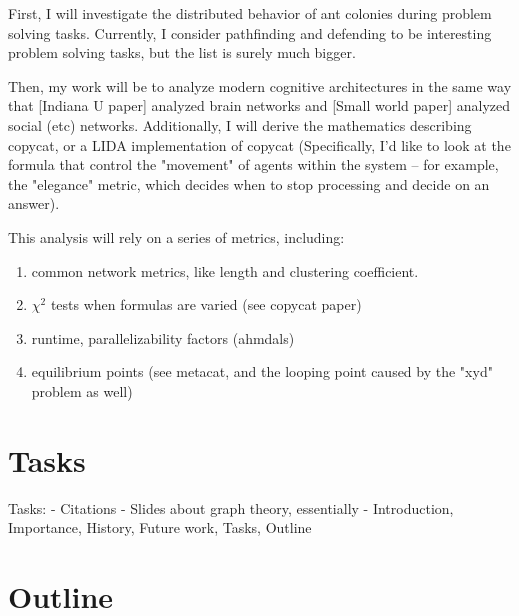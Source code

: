 \documentclass{nature}
\begin{document}
    First, I will investigate the distributed behavior of ant colonies during problem solving tasks.
    Currently, I consider pathfinding and defending to be interesting problem solving tasks, but the list is surely much bigger.

    Then, my work will be to analyze modern cognitive architectures in the same way that [Indiana U paper] analyzed brain networks and [Small world paper] analyzed social (etc) networks. 
    Additionally, I will derive the mathematics describing copycat, or a LIDA implementation of copycat (Specifically, I'd like to look at the formula that control the "movement" of agents within the system -- for example, the "elegance" metric, which decides when to stop processing and decide on an answer). 

    This analysis will rely on a series of metrics, including:
    \begin{enumerate}
        \item common network metrics, like length and clustering coefficient.
        \item $\chi ^2$ tests when formulas are varied (see copycat paper)
        \item runtime, parallelizability factors (ahmdals)
        \item equilibrium points (see metacat, and the looping point caused by the "xyd" problem as well)
    \end{enumerate}


\section{Tasks}

Tasks:
 - Citations
 - Slides about graph theory, essentially
 - Introduction, Importance, History, Future work, Tasks, Outline

\section{Outline}
\end{document}
